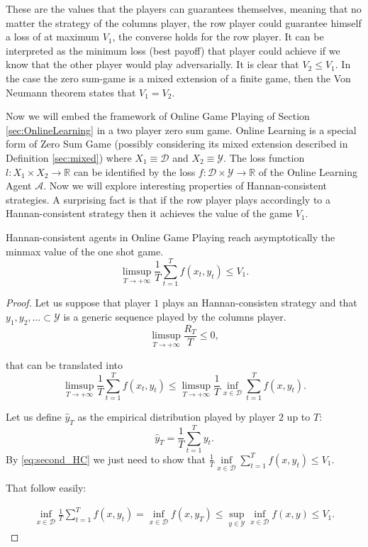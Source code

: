 These are the values that the players can guarantees themselves, meaning that no matter the strategy of the columns player, the row player could guarantee himself a loss of at maximum $V_1$, the converse holds for the row player. It can be interpreted as the minimum loss (best payoff) that player could achieve if we know that the other player would play adversarially. It is clear that $V_2\le V_1$. In the case the zero sum-game is a mixed extension of a finite game, then the Von Neumann theorem states that $V_1=V_2$.
 
Now we will embed the framework of Online Game Playing of Section \ref{sec:OnlineLearning} in a two player zero sum game. 
Online Learning is a special form of Zero Sum Game (possibly considering its mixed extension described in Definition \ref{sec:mixed}) where $X_1\equiv \mathcal D$ and $X_2\equiv \mathcal Y$. The loss function $l:X_1\times X_2\to\mathbb R$ can be identified by the loss $f:\mathcal D\times \mathcal Y\to\mathbb R$ of the Online Learning Agent $\mathcal A$.
Now we will explore interesting properties of Hannan-consistent strategies. A surprising fact is that if the row player plays accordingly to a Hannan-consistent strategy then it achieves the value of the game $V_1$. 

\begin{theorem}
    Hannan-consistent agents in Online Game Playing reach asymptotically the minmax value of the one shot game.
    $$\limsup\limits_{T\to +\infty}\frac{1}{T}\sum\limits_{t=1}^Tf(x_t,y_t)\le V_1.$$
\end{theorem}

\begin{proof}
    Let us suppose that player $1$ plays an Hannan-consisten strategy and that $y_1,y_2,\ldots \subset \mathcal Y$ is a generic sequence played by the columns player.
    \begin{equation}
        \limsup\limits_{T\to+\infty}\frac{R_T}{T}\le0,
    \end{equation}
    
    that can be translated into 
    \begin{equation}\label{eq:second_HC}
        \limsup\limits_{T\to+\infty}\frac{1}{T}\sum\limits_{t=1}^Tf(x_t,y_t)\le\limsup\limits_{T\to+\infty}\frac{1}{T}\inf\limits_{x\in\mathcal D}\sum\limits_{t=1}^Tf(x,y_t).
    \end{equation}

    Let us define $\hat y_T$ as the empirical distribution played by player $2$ up to $T$:
    $$\hat y_T=\frac{1}{T}\sum\limits_{t=1}^Ty_t.$$
    By \eqref{eq:second_HC} we just need to show that $\frac{1}{T}\inf\limits_{x\in \mathcal D} \sum\limits_{t=1}^T f(x,y_t)\le V_1.$

    That follow easily:

    \begin{align}
        \inf\limits_{x\in\mathcal D}\frac{1}{T}\sum\limits_{t=1}^T f(x,y_t)=\inf\limits_{x\in\mathcal D} f(x,y_T)\le\sup\limits_{y\in\mathcal Y}\inf\limits_{x\in\mathcal D} f(x,y)\le V_1.
    \end{align}
\end{proof}

